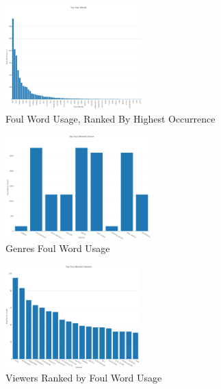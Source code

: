\documentclass[10pt,conference]{IEEEtran}
\begin{document}
\begin{figure}[h]
    \centering
    \includegraphics[height=4cm,keepaspectratio]{FoulWordUsage.png}
    \captionsetup                               {justification=centering}
    \caption                                    {Foul Word Usage, Ranked By Highest Occurrence}
    \label                                      {fig:FoulWordUsage}
\end{figure}

\begin{figure}[h]
    \centering
    \includegraphics[height=4cm,keepaspectratio]{FoulWordGenres.png}
    \captionsetup                               {justification=centering}
    \caption                                    {Genres Foul Word Usage}
    \label                                      {fig:FoulWordGenres}
\end{figure}

\begin{figure}[h]
    \centering
    \includegraphics[height=4cm,keepaspectratio]{FoulWordViewersRank.png}
    \captionsetup                               {justification=centering}
    \caption                                    {Viewers Ranked by Foul Word Usage}
    \label                                      {fig:FoulWordViewersRank}
\end{figure}
\end{document}
